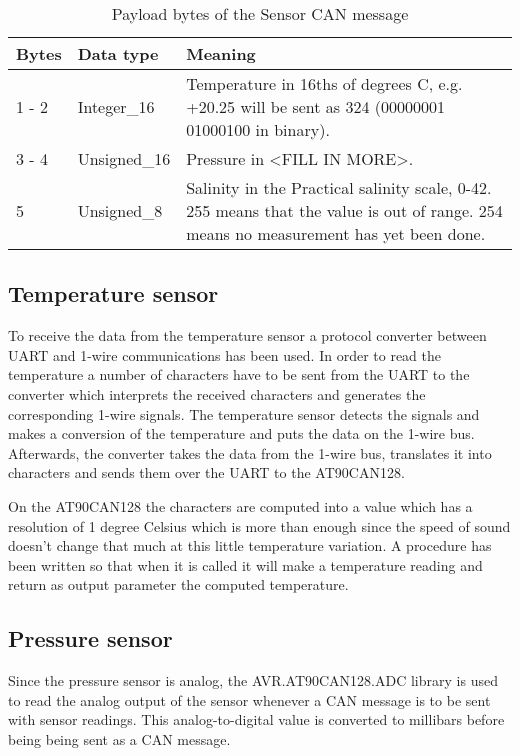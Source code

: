 \begin{table*}
\centering
    \caption{Payload bytes of the Sensor CAN message}
    \begin{tabular}{|l|l|p{11cm}|} \hline
    \label{table:SensorMessage}
    	\textbf{Bytes} & \textbf{Data type} & \textbf{Meaning} \\ \hline
        1 - 2 & Integer\_16 & Temperature in 16ths of degrees C, e.g. +20.25 will be sent as 324 \newline 
        (00000001 01000100 in binary). \\ \hline
        3 - 4 & Unsigned\_16 & Pressure in <FILL IN MORE>. \\ \hline
        5  & Unsigned\_8 & Salinity in the Practical salinity scale, 0-42. 255 means that the value is out of range. 254 means no measurement has yet been done. \\ \hline
    \end{tabular}
\end{table*}

\subsection{Temperature sensor}
To receive the data from the temperature sensor a protocol converter between UART and 1-wire communications has been used. In order to read the temperature a number of characters have to be sent from the UART to the converter which interprets the received characters and generates the corresponding 1-wire signals. The temperature sensor detects the signals and makes a conversion of the temperature and puts the data on the 1-wire bus. Afterwards, the converter takes the data from the 1-wire bus, translates it into characters and sends them over the UART to the AT90CAN128. 

On the AT90CAN128 the characters are computed into a value which has a resolution of 1 degree Celsius which is more than enough since the speed of sound doesn't change that much at this little temperature variation. A procedure has been written so that when it is called it will make a temperature reading and return as output parameter the computed temperature.

\subsection{Pressure sensor}
Since the pressure sensor is analog, the AVR.AT90CAN128.ADC library is used to read the analog output of the sensor whenever a CAN message is to be sent with sensor readings. This analog-to-digital value is converted to millibars before being being sent as a CAN message. 


